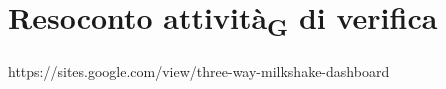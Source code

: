
\section{Resoconto attività\textsubscript{G} di verifica}
https://sites.google.com/view/three-way-milkshake-dashboard
